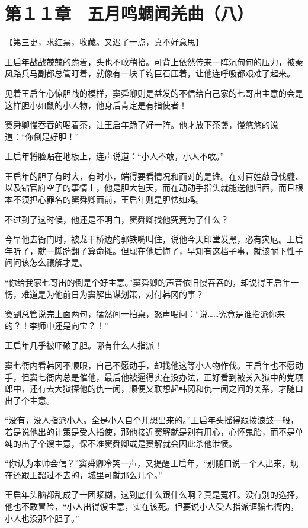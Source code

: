 \section{第１１章　五月鸣蜩闻羌曲（八）}

【第三更，求红票，收藏。又迟了一点，真不好意思】

王启年战战兢兢的跪着，头也不敢稍抬。可背上依然传来一阵沉甸甸的压力，被秦凤路兵马副都总管盯着，就像有一块千钧巨石压着，让他连呼吸都艰难了起来。

见着王启年心惊胆战的模样，窦舜卿则是益发的不信给自己家的七哥出主意的会是这样胆小如鼠的小人物，他身后肯定是有指使者！

窦舜卿慢吞吞的喝着茶，让王启年跪了好一阵。他才放下茶盏，慢悠悠的说道：“你倒是好胆！”

王启年将脸贴在地板上，连声说道：“小人不敢，小人不敢。”

王启年的胆子有时大，有时小，端得要看情况和面对的是谁。在对百姓敲骨伐髓、以及钻官府空子的事情上，他是胆大包天，而在动动手指头就能送他归西，而且根本不须担心罪名的窦舜卿面前，王启年则是胆怯如鸡。

不过到了这时候，他还是不明白，窦舜卿找他究竟为了什么？

今早他去衙门时，被龙干桥边的郭铁嘴叫住，说他今天印堂发黑，必有灾厄。王启年听了，就一脚踹翻了算命摊。但现在他后悔了，早知有这档子事，就该耐下性子问问该怎么禳解才是。

“你给我家七哥出的倒是个好主意。”窦舜卿的声音依旧慢吞吞的，却说得王启年一愣，难道是为他前日为窦解出谋划策，对付韩冈的事？

窦副总管说完上面两句，猛然间一拍桌，怒声喝问：“说……究竟是谁指派你来的？！李师中还是向宝？！”

王启年几乎被吓破了胆。哪有什么人指派！

窦七衙内看韩冈不顺眼，自己不愿动手，却找他这等小人物作伐。王启年也不愿动手，但窦七衙内总是催他，最后他被逼得实在没办法，正好看到被关入狱中的党项郎中，还有去大狱探他的仇一闻，顺便又联想起韩冈和仇一闻之间的关系，才随口出了个主意。

“没有，没人指派小人。全是小人自个儿想出来的。”王启年头摇得跟拨浪鼓一般，若是说他出的计策是受人指使，那他接近窦解就是别有用心，心怀鬼胎，而不是单纯的出了个馊主意，保不准窦舜卿或是窦解就会因此杀他泄愤。

“你认为本帅会信？”窦舜卿冷笑一声，又提醒王启年，“别随口说一个人出来，现在还跟王韶过不去的，城里可就那么几个。”

王启年头脑都乱成了一团浆糊，这到底什么跟什么啊？真是冤枉。没有别的选择，他也不敢冒险，“小人出得馊主意，实在该死。但要说小人受人指派诓骗七衙内，小人也没那个胆子。”

